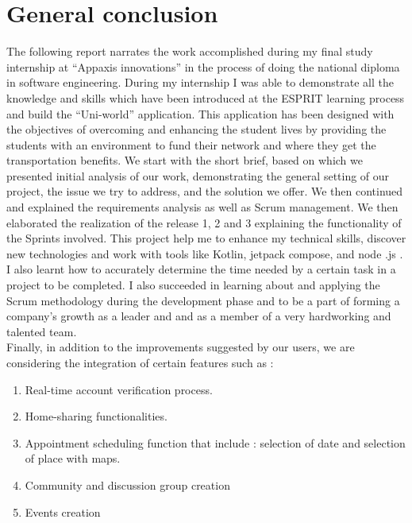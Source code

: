 \chapter*{General conclusion}
The following report narrates the work accomplished during my final study internship at “Appaxis innovations” in the process of doing the national diploma in software engineering.
During my internship I was able to demonstrate all the knowledge and skills which have been introduced at the ESPRIT learning process and build the “Uni-world” application. This application has been designed with the objectives of overcoming and enhancing the student lives by providing the students with an environment to fund their network  and where they get the transportation benefits.
We start with the short brief, based on which we presented initial analysis of our work, demonstrating the general setting of our project, the issue we try to address, and the solution we offer. We then continued and explained the requirements analysis as well as Scrum management. We then elaborated the realization of the release 1, 2 and 3 explaining the functionality of the Sprints involved.
This project help me to enhance my technical skills, discover new technologies and work with tools like Kotlin, jetpack compose, and node .js .
I also learnt how to accurately determine the time needed by a certain task in a project to be completed.
I also succeeded in learning about and applying the Scrum methodology during the development phase and to be a part of forming a company’s growth as a leader and and as a member of a very hardworking and talented team. \\

Finally, in addition to the improvements suggested by our users, we are considering the integration of certain features such as :
\begin{enumerate}
    \item  Real-time account verification process.
    \item Home-sharing functionalities.
    \item Appointment scheduling function that include : selection of date and selection of place with maps.
    \item Community and discussion group creation
    \item Events creation

\end{enumerate}